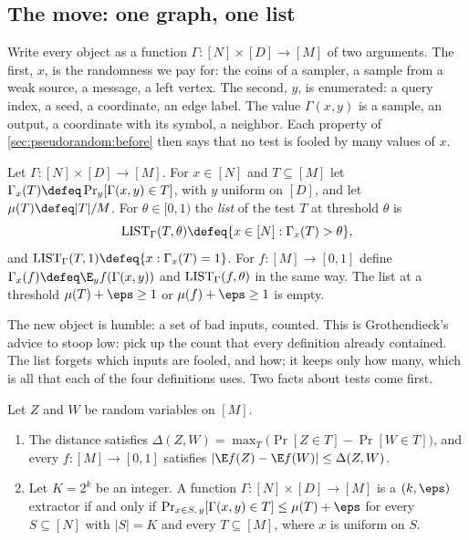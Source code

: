 \begin{refsection}
\section{The move: one graph, one list}\label{sec:pseudorandom:move}

Write every object as a function $\Gamma\colon[N]\times[D]\to[M]$ of two arguments. The first, $x$, is the randomness we pay for: the coins of a sampler, a sample from a weak source, a message, a left vertex. The second, $y$, is enumerated: a query index, a seed, a coordinate, an edge label. The value $\Gamma(x,y)$ is a sample, an output, a coordinate with its symbol, a neighbor. Each property of \cref{sec:pseudorandom:before} then says that no test is fooled by many values of $x$.

\begin{definition}[Lists]\label{def:pseudorandom:list}
Let $\Gamma\colon[N]\times[D]\to[M]$. For $x\in[N]$ and $T\subseteq[M]$ let $\Gamma_x(T)\defeq\Pr_y[\Gamma(x,y)\in T]$, with $y$ uniform on $[D]$, and let $\mu(T)\defeq|T|/M$. For $\theta\in[0,1)$ the \emph{list} of the test $T$ at threshold $\theta$ is
\[
  \pseudorandomList_\Gamma(T,\theta)\defeq\{x\in[N]:\Gamma_x(T)>\theta\},
\]
and $\pseudorandomList_\Gamma(T,1)\defeq\{x:\Gamma_x(T)=1\}$. For $f\colon[M]\to[0,1]$ define $\Gamma_x(f)\defeq\E_yf(\Gamma(x,y))$ and $\mathrm{LIST}_\Gamma(f,\theta)$ in the same way. The list at a threshold $\mu(T)+\eps\ge1$ or $\mu(f)+\eps\ge1$ is empty.
\end{definition}

The new object is humble: a set of bad inputs, counted. This is Grothendieck's advice to stoop low: pick up the count that every definition already contained. The list forgets which inputs are fooled, and how; it keeps only how many, which is all that each of the four definitions uses. Two facts about tests come first.

\begin{lemma}[Tests]\label{lem:pseudorandom:tests}
Let $Z$ and $W$ be random variables on $[M]$.
\begin{enumerate}
\item The distance satisfies $\Delta(Z,W)=\max_T\bigl(\Pr[Z\in T]-\Pr[W\in T]\bigr)$, and every $f\colon[M]\to[0,1]$ satisfies $|\E f(Z)-\E f(W)|\le\Delta(Z,W)$.
\item Let $K=2^k$ be an integer. A function $\Gamma\colon[N]\times[D]\to[M]$ is a $(k,\eps)$ extractor if and only if $\Pr_{x\in S,\,y}[\Gamma(x,y)\in T]\le\mu(T)+\eps$ for every $S\subseteq[N]$ with $|S|=K$ and every $T\subseteq[M]$, where $x$ is uniform on $S$.
\end{enumerate}
\end{lemma}


\end{refsection}
